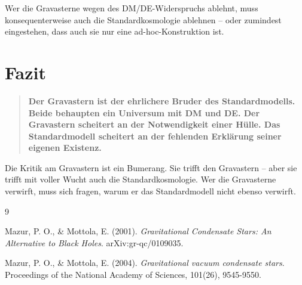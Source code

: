 \documentclass[12pt,a4paper]{article}
\begin{document}
Wer die Gravasterne wegen des DM/DE-Widerspruchs ablehnt, muss konsequenterweise auch die Standardkosmologie ablehnen – oder zumindest eingestehen, dass auch sie nur eine ad-hoc-Konstruktion ist.

\section{Fazit}

\begin{quote}
\textbf{Der Gravastern ist der ehrlichere Bruder des Standardmodells. Beide behaupten ein Universum mit DM und DE. Der Gravastern scheitert an der Notwendigkeit einer Hülle. Das Standardmodell scheitert an der fehlenden Erklärung seiner eigenen Existenz.}
\end{quote}

Die Kritik am Gravastern ist ein Bumerang. Sie trifft den Gravastern – aber sie trifft mit voller Wucht auch die Standardkosmologie. Wer die Gravasterne verwirft, muss sich fragen, warum er das Standardmodell nicht ebenso verwirft.

\newpage

\begin{thebibliography}{9}

Mazur, P. O., \& Mottola, E. (2001).
\emph{Gravitational Condensate Stars: An Alternative to Black Holes}.
arXiv:gr-qc/0109035.

Mazur, P. O., \& Mottola, E. (2004).
\emph{Gravitational vacuum condensate stars}.
Proceedings of the National Academy of Sciences, 101(26), 9545-9550.

\end{thebibliography}
\end{document}
